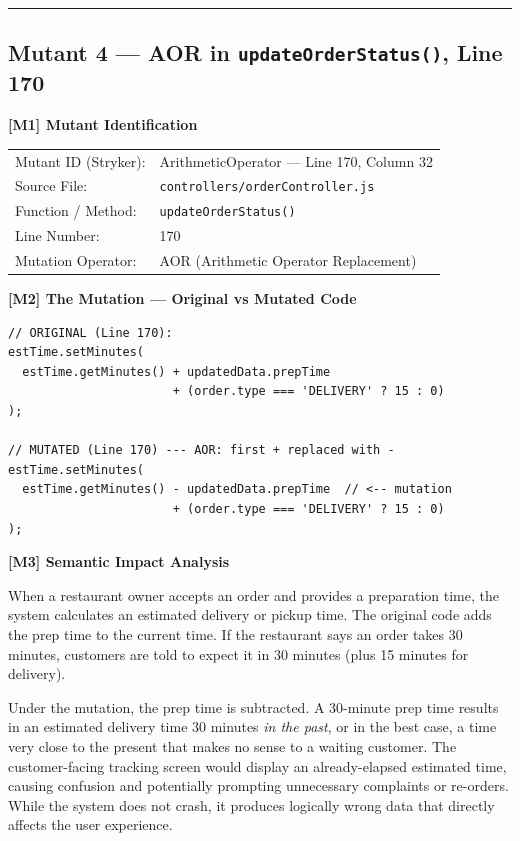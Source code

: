\documentclass[12pt, a4paper]{article}
\begin{document}
\bigskip\hrule\bigskip

\subsection*{Mutant 4 --- AOR in \texttt{updateOrderStatus()}, Line 170}

\begin{mutantbox}
\textbf{[M1] Mutant Identification}\\[4pt]
\begin{tabular}{ll}
Mutant ID (Stryker):    & ArithmeticOperator --- Line 170, Column 32 \\
Source File:            & \texttt{controllers/orderController.js} \\
Function / Method:      & \texttt{updateOrderStatus()} \\
Line Number:            & 170 \\
Mutation Operator:      & AOR (Arithmetic Operator Replacement) \\
\end{tabular}
\end{mutantbox}

\bigskip

\textbf{[M2] The Mutation --- Original vs Mutated Code}

\begin{lstlisting}[caption={Mutant 4: Original vs Mutated (Line 170)}]
// ORIGINAL (Line 170):
estTime.setMinutes(
  estTime.getMinutes() + updatedData.prepTime
                       + (order.type === 'DELIVERY' ? 15 : 0)
);

// MUTATED (Line 170) --- AOR: first + replaced with -
estTime.setMinutes(
  estTime.getMinutes() - updatedData.prepTime  // <-- mutation
                       + (order.type === 'DELIVERY' ? 15 : 0)
);
\end{lstlisting}

\textbf{[M3] Semantic Impact Analysis}

When a restaurant owner accepts an order and provides a preparation time, the system calculates an estimated delivery or pickup time. The original code adds the prep time to the current time. If the restaurant says an order takes 30 minutes, customers are told to expect it in 30 minutes (plus 15 minutes for delivery).

Under the mutation, the prep time is subtracted. A 30-minute prep time results in an estimated delivery time 30 minutes \emph{in the past}, or in the best case, a time very close to the present that makes no sense to a waiting customer. The customer-facing tracking screen would display an already-elapsed estimated time, causing confusion and potentially prompting unnecessary complaints or re-orders. While the system does not crash, it produces logically wrong data that directly affects the user experience.
\end{document}
